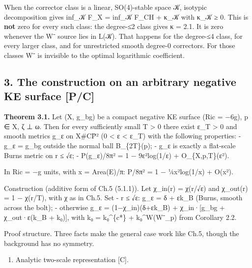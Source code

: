 \documentclass[
  10pt,
]{report}
\providecommand{\tightlist}{%
  \setlength{\itemsep}{0pt}\setlength{\parskip}{0pt}}
\begin{document}
When the corrector class is a linear, SO(4)-stable space 𝒦, isotypic
decomposition gives inf\_𝒦 F\_X = inf\_𝒦 F\_CH + κ\_𝒦 with κ\_𝒦 ≥ 0.
This is \textbf{not} zero for every such class: the degree-≤2 class
gives κ = 2.1. It is zero whenever the W⁻ source lies in L(𝒦). That
happens for the degree-≤4 class, for every larger class, and for
unrestricted smooth degree-0 correctors. For those classes W⁻ is
invisible to the optimal logarithmic coefficient.

\hypertarget{the-construction-on-an-arbitrary-negative-ke-surface-pc}{%
\subsection{3. The construction on an arbitrary negative KE surface
{[}P/C{]}}\label{the-construction-on-an-arbitrary-negative-ke-surface-pc}}

\textbf{Theorem 3.1.} Let (X, g\_bg) be a compact negative KE surface
(Ric = −6g), p ∈ X, ζ ⊥ ω. Then for every sufficiently small T
\textgreater{} 0 there exist ε\_T \textgreater{} 0 and smooth metrics
g\_ε on X\#CP̄² (0 \textless{} ε \textless{} ε\_T) with the following
properties: - g\_ε = g\_bg outside the normal ball B\_\{2T\}(p); - g\_ε
is exactly a flat-scale Burns metric on r ≤ √ε; - P(g\_ε)/8π² = 1 −
9ε²log(1/ε) + O\_\{X,p,T\}(ε²).

In Ric = −g units, with x = Area(E)/π: P/8π² = 1 − ¼x²log(1/x) + O(x²).

Construction (additive form of Ch.5 (5.1.1)). Let χ\_in(r) = χ(r/√ε) and
χ\_out(r) = 1 − χ(r/T), with χ as in Ch.5. Set - r ≤ √ε: g\_ε = δ +
εk\_B (Burns, smooth across the bolt); - otherwise g\_ε =
(1−χ\_in)(δ+εk\_B) + χ\_in·{[}g\_bg + χ\_out·ε(k\_B + k₀){]}, with k₀ =
k₀\^{}\{c*\} + k₀\^{}W(W⁻\_p) from Corollary 2.2.

Proof structure. Three facts make the general case work like Ch.5,
though the background has no symmetry.

\begin{enumerate}
\def\labelenumi{(\Alph{enumi})}
\tightlist
\item
  Analytic two-scale representation {[}C{]}.
\end{enumerate}
\end{document}
